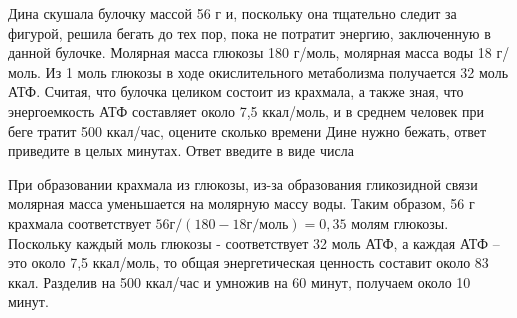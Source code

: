 
Дина
скушала булочку массой 56 г и, поскольку она тщательно следит за фигурой,
решила бегать до тех пор, пока не потратит энергию, заключенную в данной
булочке. Молярная масса глюкозы 180 г/моль, молярная масса воды 18 г/моль. Из 1
моль глюкозы в ходе окислительного метаболизма получается 32 моль АТФ. Считая,
что булочка целиком состоит из крахмала, а также зная, что энергоемкость
АТФ  составляет около 7,5 ккал/моль, и в
среднем человек при беге тратит 500 ккал/час, оцените сколько времени Дине
нужно бежать, ответ приведите в целых минутах. Ответ введите в виде числа

\solutionSection

При образовании крахмала из глюкозы, из-за образования гликозидной связи молярная 
масса уменьшается на молярную массу воды. Таким образом, 56 г крахмала соответствует 
$56 \text{г}/(180-18 \text{г/моль})=0,35$ молям глюкозы. Поскольку каждый моль глюкозы - соответствует 32 моль АТФ, 
а каждая АТФ – это около 7,5 ккал/моль, то общая энергетическая ценность составит около 83 ккал. 
Разделив на 500 ккал/час и умножив на 60 минут, получаем около 10 минут.

